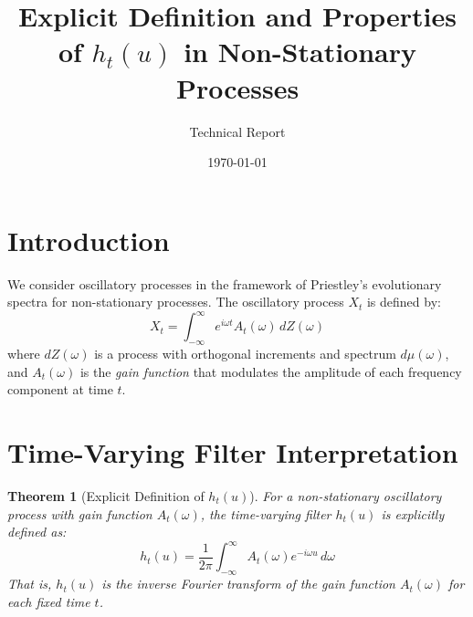 \documentclass{article}
\title{Explicit Definition and Properties of $h_t(u)$ in Non-Stationary Processes}
\author{Technical Report}
\date{\today}
\newtheorem{theorem}{Theorem}
\theoremstyle{definition}
\begin{document}
\maketitle

\section{Introduction}
We consider oscillatory processes in the framework of Priestley's evolutionary spectra for non-stationary processes. The oscillatory process $X_t$ is defined by:
\begin{equation}
X_t = \int_{-\infty}^{\infty} e^{i\omega t} A_t(\omega) \, dZ(\omega)
\end{equation}
where $dZ(\omega)$ is a process with orthogonal increments and spectrum $d\mu(\omega)$, and $A_t(\omega)$ is the \textit{gain function} that modulates the amplitude of each frequency component at time $t$.

\section{Time-Varying Filter Interpretation}

\begin{theorem}[Explicit Definition of $h_t(u)$]
For a non-stationary oscillatory process with gain function $A_t(\omega)$, the time-varying filter $h_t(u)$ is explicitly defined as:
\begin{equation}
h_t(u) = \frac{1}{2\pi}\int_{-\infty}^{\infty} A_t(\omega) e^{-i\omega u} \, d\omega
\end{equation}
That is, $h_t(u)$ is the inverse Fourier transform of the gain function $A_t(\omega)$ for each fixed time $t$.
\end{theorem}
\end{document}
